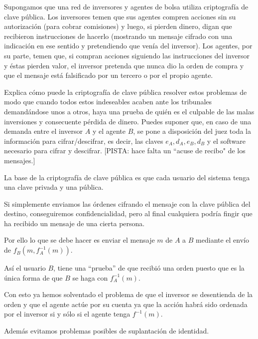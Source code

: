 \begin{problem}[4] Supongamos que una red de inversores y agentes de bolsa utiliza criptografía de clave pública.
  Los inversores temen que sus agentes compren acciones sin
  su autorización (para cobrar comisiones) y luego, si pierden dinero, digan que recibieron instrucciones de hacerlo
  (mostrando un mensaje cifrado con una indicación en ese sentido y pretendiendo que venía del inversor).
  Los agentes, por su parte, temen que, si compran acciones siguiendo las instrucciones del inversor y éstas pierden valor,
   el inversor pretenda que nunca dio la orden de compra y que el mensaje está falsificado por un tercero o por el propio agente.

Explica cómo puede la criptografía de clave pública resolver estos
problemas de modo que cuando todos estos indeseables acaben ante
los tribunales demandándose unos a otros, haya una prueba de quién
es el culpable de las malas inversiones y consecuente pérdida de
dinero. Puedes suponer que, en caso de una demanda entre el
inversor $A$ y el agente $B$, se pone a disposición del juez toda
la información para cifrar/descifrar, es decir, las claves $e_A,
d_A, e_B, d_B$ y el software necesario para cifrar y descifrar.
[PISTA: hace falta un ``acuse de recibo" de los mensajes.]

\solution
{}

La base de la criptografía de clave pública es que cada usuario del sistema tenga una clave privada y una pública.

Si simplemente enviamos las órdenes cifrando el mensaje con la clave pública del destino, conseguiremos confidencialidad, pero al final cualquiera podría fingir que ha recibido un mensaje de una cierta persona.

Por ello lo que se debe hacer es enviar el mensaje $m$ de $A$ a $B$ mediante el envío de $f_B(m,f_A^{-1}(m))$.

Así el usuario $B$, tiene una ``prueba'' de que recibió una orden puesto que es la única forma de que $B$ se haga con $f^{-1}_A(m)$.

Con esto ya hemos solventado el problema de que el inversor se desentienda de la orden y que el agente actúe por su cuenta ya que la acción habrá sido ordenada por el inversor si y sólo si el agente tenga $f^{-1}(m)$.

Además evitamos problemas posibles de suplantación de identidad.

\end{problem}



